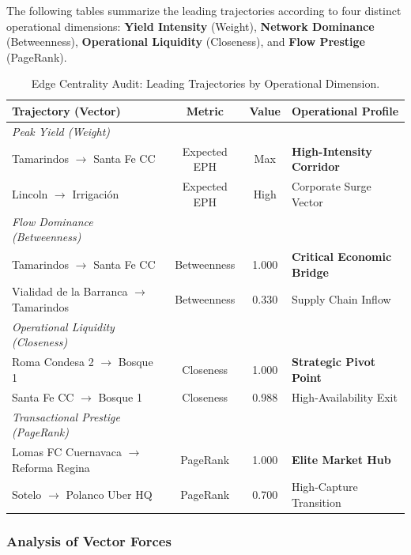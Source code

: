 The following tables summarize the leading trajectories according to four distinct operational dimensions: \textbf{Yield Intensity} (Weight), \textbf{Network Dominance} (Betweenness), \textbf{Operational Liquidity} (Closeness), and \textbf{Flow Prestige} (PageRank).

\begin{table}[H]
    \centering
    \small
    \begin{tabularx}{\textwidth}{l c c X}
        \toprule
        \textbf{Trajectory (Vector)} & \textbf{Metric} & \textbf{Value} & \textbf{Operational Profile} \\
        \midrule
        \textit{Peak Yield (Weight)} & & & \\
        Tamarindos $\rightarrow$ Santa Fe CC & Expected EPH & Max & \textbf{High-Intensity Corridor} \\
        Lincoln $\rightarrow$ Irrigación & Expected EPH & High & Corporate Surge Vector \\
        \addlinespace
        \textit{Flow Dominance (Betweenness)} & & & \\
        Tamarindos $\rightarrow$ Santa Fe CC & Betweenness & 1.000 & \textbf{Critical Economic Bridge} \\
        Vialidad de la Barranca $\rightarrow$ Tamarindos & Betweenness & 0.330 & Supply Chain Inflow \\
        \addlinespace
        \textit{Operational Liquidity (Closeness)} & & & \\
        Roma Condesa 2 $\rightarrow$ Bosque 1 & Closeness & 1.000 & \textbf{Strategic Pivot Point} \\
        Santa Fe CC $\rightarrow$ Bosque 1 & Closeness & 0.988 & High-Availability Exit \\
        \addlinespace
        \textit{Transactional Prestige (PageRank)} & & & \\
        Lomas FC Cuernavaca $\rightarrow$ Reforma Regina & PageRank & 1.000 & \textbf{Elite Market Hub} \\
        Sotelo $\rightarrow$ Polanco Uber HQ & PageRank & 0.700 & High-Capture Transition \\
        \bottomrule
    \end{tabularx}
    \caption{Edge Centrality Audit: Leading Trajectories by Operational Dimension.}
    \label{tab:edge_audit}
\end{table}

\subsubsection{Analysis of Vector Forces}

